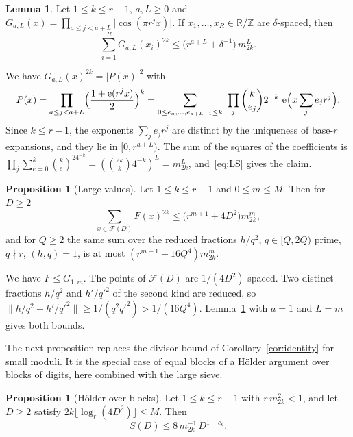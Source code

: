 \documentclass[11pt]{amsart}
\makeatletter
\theoremstyle{definition}
\newtheorem{proposition}[theorem]{Proposition}
\newtheorem{lemma}[theorem]{Lemma}
\numberwithin{equation}{section}
\renewenvironment{proof}[1][\proofname]{\par\pushQED{\qed}\normalfont\topsep6\p@\@plus6\p@\relax\trivlist\item[\hskip\labelsep\upshape#1.]\ignorespaces}{\popQED\endtrivlist\@endpefalse}
\newcommand{\e}{\mathrm{e}}
\newcommand{\R}{\mathbb{R}}
\newcommand{\Z}{\mathbb{Z}}
\newcommand{\FF}{\mathscr{F}}
\newcommand{\norm}[1]{\lVert #1\rVert}
\makeatother
\begin{document}
\begin{lemma}\label{lem:LSblock}
Let $1\le k\le r-1$, $a,L\ge0$ and $G_{a,L}(x)=\prod_{a\le j<a+L}\lvert\cos(\pi r^jx)\rvert$. If $x_1,\dots,x_R\in\R/\Z$ are $\delta$-spaced, then
\[
\sum_{i=1}^RG_{a,L}(x_i)^{2k}\le\bigl(r^{a+L}+\delta^{-1}\bigr)\,m_{2k}^L.
\]
\end{lemma}

\begin{proof}
We have $G_{a,L}(x)^{2k}=\lvert P(x)\rvert^2$ with
\[
P(x)=\prod_{a\le j<a+L}\Bigl(\frac{1+\e(r^jx)}2\Bigr)^k=\sum_{0\le e_a,\dots,e_{a+L-1}\le k}\ \prod_{j}\binom k{e_j}2^{-k}\ \e\Bigl(x\sum_je_jr^j\Bigr).
\]
Since $k\le r-1$, the exponents $\sum_je_jr^j$ are distinct by the uniqueness of base-$r$ expansions, and they lie in $[0,r^{a+L})$. The sum of the squares of the coefficients is $\prod_j\sum_{e=0}^k\binom ke^24^{-k}=(\binom{2k}k4^{-k})^L=m_{2k}^L$, and~\eqref{eq:LS} gives the claim.
\end{proof}

\begin{proposition}[Large values]\label{prop:L}
Let $1\le k\le r-1$ and $0\le m\le M$. Then for $D\ge2$
\[
\sum_{x\in\FF(D)}F(x)^{2k}\le\bigl(r^{m+1}+4D^2\bigr)m_{2k}^m,
\]
and for $Q\ge2$ the same sum over the reduced fractions $h/q^2$, $q\in[Q,2Q)$ prime, $q\nmid r$, $(h,q)=1$, is at most $(r^{m+1}+16Q^4)m_{2k}^m$.
\end{proposition}

\begin{proof}
We have $F\le G_{1,m}$. The points of $\FF(D)$ are $1/(4D^2)$-spaced. Two distinct fractions $h/q^2$ and $h'/q'^2$ of the second kind are reduced, so $\norm{h/q^2-h'/q'^2}\ge1/(q^2q'^2)>1/(16Q^4)$. Lemma~\ref{lem:LSblock} with $a=1$ and $L=m$ gives both bounds.
\end{proof}

The next proposition replaces the divisor bound of Corollary~\ref{cor:identity} for small moduli. It is the special case of equal blocks of a H\"older argument over blocks of digits, here combined with the large sieve.

\begin{proposition}[H\"older over blocks]\label{prop:H}
Let $1\le k\le r-1$ with $r\,m_{2k}^2<1$, and let $D\ge2$ satisfy $2k\lfloor\log_r(4D^2)\rfloor\le M$. Then
\[
S(D)\le8\,m_{2k}^{-1}\,D^{1-c_k}.
\]
\end{proposition}
\end{document}
